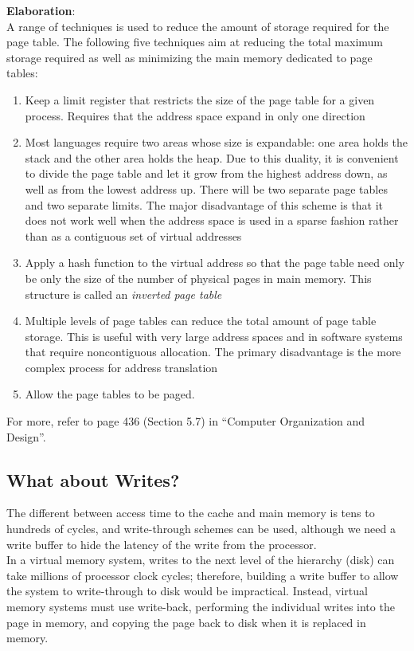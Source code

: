 \documentclass[12pt]{article}
\theoremstyle{definition}
\begin{document}
  \textbf{Elaboration}: \\
  A range of techniques is used to reduce the amount of storage required for the page table.
  The following five techniques aim at reducing the total maximum storage required as well as minimizing the main memory dedicated to page tables:
  \begin{enumerate}
    \item Keep a limit register that restricts the size of the page table for a given process.
    Requires that the address space expand in only one direction
    \item Most languages require two areas whose size is expandable: one area holds the stack and the other area holds the heap.
    Due to this duality, it is convenient to divide the page table and let it grow from the highest address down, as well as from the lowest address up.
    There will be two separate page tables and two separate limits.
    The major disadvantage of this scheme is that it does not work well when the address space is used in a sparse fashion rather than as a contiguous set of virtual addresses
    \item Apply a hash function to the virtual address so that the page table need only be only the size of the number of physical pages in main memory.
    This structure is called an \emph{inverted page table}
    \item Multiple levels of page tables can reduce the total amount of page table storage.
    This is useful with very large address spaces and in software systems that require noncontiguous allocation.
    The primary disadvantage is the more complex process for address translation
    \item Allow the page tables to be paged.
  \end{enumerate}
  For more, refer to page 436 (Section 5.7) in ``Computer Organization and Design''.

  \subsection{What about Writes?}
  The different between access time to the cache and main memory is tens to hundreds of cycles, and write-through schemes can be used, although we need a write buffer to hide the latency of the write from the processor. \\
  In a virtual memory system, writes to the next level of the hierarchy (disk) can take millions of processor clock cycles;
  therefore, building a write buffer to allow the system to write-through to disk would be impractical.
  Instead, virtual memory systems must use write-back, performing the individual writes into the page in memory, and copying the page back to disk when it is replaced in memory. \\
\end{document}
